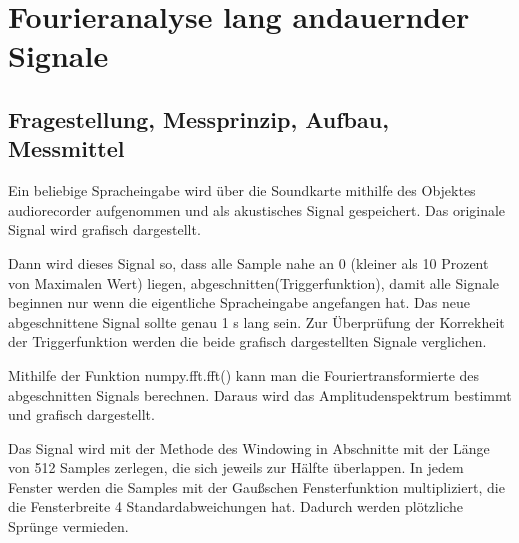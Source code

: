 \documentclass[12pt, oneside, a4paper, \docLanguage]{report}
\begin{document}

\setcounter{section}{0}



\clearpage

%
%


%
%


%
%





\setcounter{page}{1} 
\pagestyle{default}

%
%
\chapter{Fourieranalyse lang andauernder Signale}

\section{Fragestellung, Messprinzip, Aufbau, Messmittel}
\label{chap:VERSUCH_1_FRAGESTELLUNG}

\qquad Ein beliebige Spracheingabe wird über die Soundkarte mithilfe des Objektes audiorecorder aufgenommen und als akustisches Signal gespeichert.
Das originale Signal wird grafisch dargestellt. 

Dann wird dieses Signal so, dass alle Sample nahe an 0 (kleiner als 10 Prozent von Maximalen Wert) liegen, abgeschnitten(Triggerfunktion), damit alle Signale beginnen nur wenn die eigentliche Spracheingabe angefangen hat. Das neue abgeschnittene Signal sollte genau 1 s lang sein. Zur Überprüfung der Korrekheit der Triggerfunktion werden die beide grafisch dargestellten Signale verglichen.

Mithilfe der Funktion numpy.fft.fft() kann man die Fouriertransformierte des abgeschnitten Signals berechnen. Daraus wird das Amplitudenspektrum bestimmt und grafisch dargestellt.
 
Das Signal wird mit der Methode des Windowing in Abschnitte mit der Länge von 512 Samples zerlegen, die sich jeweils zur Hälfte überlappen. In jedem Fenster werden die Samples mit der Gaußschen Fensterfunktion multipliziert, die die Fensterbreite 4 Standardabweichungen hat. Dadurch werden plötzliche Sprünge vermieden.
\end{document}
